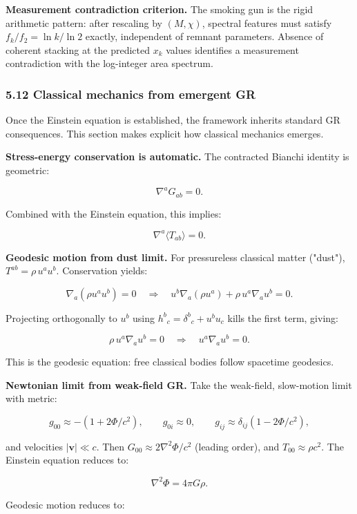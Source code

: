\textbf{Measurement contradiction criterion.} The smoking gun is the rigid arithmetic pattern: after rescaling by \((M, \chi)\), spectral features must satisfy \(f_k/f_2 =
\ln k / \ln 2\) exactly, independent of remnant parameters. Absence of coherent stacking at the predicted \(x_k\) values identifies a measurement contradiction with the log-integer area spectrum.

\subsubsection{5.12 Classical mechanics from emergent GR}\label{512-classical-mechanics-from-emergent-gr}

Once the Einstein equation is established, the framework inherits standard GR consequences. This section makes explicit how classical mechanics emerges.

\textbf{Stress-energy conservation is automatic.} The contracted Bianchi identity is geometric:

\[
\nabla^a G_{ab} = 0.
\]

Combined with the Einstein equation, this implies:

\[
\nabla^a \langle T_{ab} \rangle = 0.
\]

\textbf{Geodesic motion from dust limit.} For pressureless classical matter ("dust"), \(T^{ab} = \rho \, u^a u^b\). Conservation yields:

\[
\nabla_a(\rho u^a u^b) = 0
\quad \Rightarrow \quad
u^b \nabla_a(\rho u^a) + \rho \, u^a \nabla_a u^b = 0.
\]

Projecting orthogonally to \(u^b\) using \(h^b{}_c = \delta^b{}_c + u^b u_c\) kills the first term, giving:

\[
\rho \, u^a \nabla_a u^b = 0
\quad \Rightarrow \quad
u^a \nabla_a u^b = 0.
\]

This is the geodesic equation: free classical bodies follow spacetime geodesics.

\textbf{Newtonian limit from weak-field GR.} Take the weak-field, slow-motion limit with metric:

\[
g_{00} \approx -(1 + 2\Phi/c^2), \qquad
g_{0i} \approx 0, \qquad
g_{ij} \approx \delta_{ij}(1 - 2\Phi/c^2),
\]

and velocities \(|\mathbf{v}| \ll c\). Then \(G_{00} \approx 2\nabla^2\Phi/c^2\) (leading order), and \(T_{00} \approx \rho c^2\). The Einstein equation reduces to:

\[
\nabla^2 \Phi = 4\pi G \rho.
\]

Geodesic motion reduces to:

